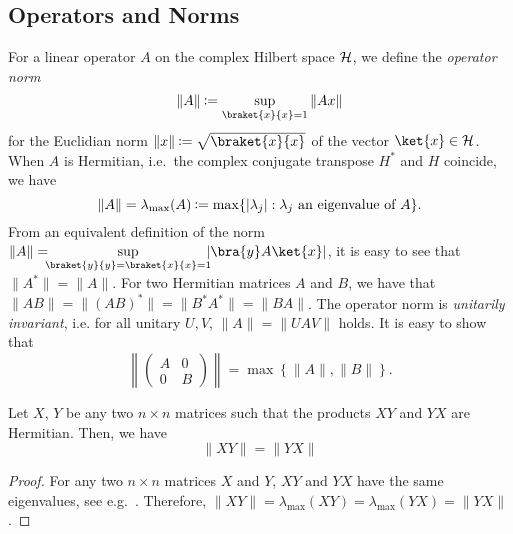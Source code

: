 \subsection{Operators and Norms} \label{sec:norms}
For a linear operator $A$ on the complex Hilbert space $\mathcal{H}$, we
define the \emph{operator norm}
\[
\| A \| \assign \sup_{\braket{x}{x}=1} \|Ax\|
\]
for the Euclidian norm $\|x\| \assign \sqrt{\braket{x}{x}}$ of the vector $\ket{x} \in \cH$. When $A$
is Hermitian, i.e.~the complex conjugate transpose $H^*$ and $H$ coincide, we have
\[
\| A \| = \lambda_{\max}(A) \assign \max\{|\lambda_j| : \lambda_j
  \mbox{ an eigenvalue of } A \}.
\]
From an equivalent definition of the norm $\|A\|=
\!\!\!\sup\limits_{\braket{y}{y}=\braket{x}{x}=1}
\!\!\!|\bra{y}A\ket{x}|$, it is easy to see that $\|A^*\|=\|A\|$. For
two Hermitian matrices $A$ and $B$, we have that $\| AB \| =
\|(AB)^*\|=\|B^*A^*\|=\|BA\|$.  The operator norm is \emph{unitarily
  invariant}, i.e. for all unitary $U,V$, $\|A\|=\|UAV\|$ holds. It
is easy to show that
\[ \left\| \begin{pmatrix} A & 0 \\ 0 & B \end{pmatrix} \right\| =\max\left\{\|A\|,\|B\|\right\}.
\]

\begin{lemma} \label{lem:ineq}
Let $X$, $Y$ be any two $n \times n$ matrices such that the products $XY$ and $YX$
are Hermitian. Then, we have
\[ \|XY\| = \|YX\| \] 
\end{lemma}
\begin{proof}
For any two $n \times n$ matrices $X$ and $Y$, $XY$ and $YX$ have the
same eigenvalues, see e.g.\ \cite[Exercise I.3.7]{Bhatia97}. Therefore,
$\| XY \| = \lambda_{\max}(XY) = \lambda_{\max}(YX) = \|YX\|$.
\end{proof}
                                
